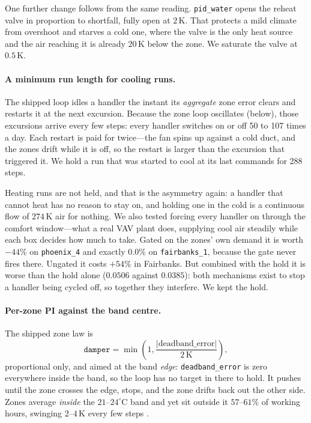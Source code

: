 \documentclass[10pt]{article}
\begin{document}
One further change follows from the same reading. \texttt{pid\_water} opens the
reheat valve in proportion to shortfall, fully open at $2$\,K. That protects a
mild climate from overshoot and starves a cold one, where the valve is the only
heat source and the air reaching it is already $20$\,K below the zone. We
saturate the valve at $0.5$\,K.

\paragraph{A minimum run length for cooling runs.} The shipped loop idles a
handler the instant its \emph{aggregate} zone error clears and restarts it at
the next excursion. Because the zone loop oscillates (below), those excursions
arrive every few steps: every handler switches on or off 50 to 107 times a
day. Each restart is paid for twice---the fan spins up against a cold duct, and
the zones drift while it is off, so the restart is larger than the excursion
that triggered it. We hold a run that was started to cool at its last commands
for 288 steps.

Heating runs are not held, and that is the asymmetry again: a handler that
cannot heat has no reason to stay on, and holding one in the cold is a
continuous flow of $274$\,K air for nothing. We also tested forcing every
handler on through the comfort window---what a real VAV plant does, supplying
cool air steadily while each box decides how much to take. Gated on the zones'
own demand it is worth $-44\%$ on \texttt{phoenix\_4} and exactly $0.0\%$ on
\texttt{fairbanks\_1}, because the gate never fires there. Ungated it costs
$+54\%$ in Fairbanks. But combined with the hold it is worse than the hold
alone ($0.0506$ against $0.0385$): both mechanisms exist to stop a handler
being cycled off, so together they interfere. We kept the hold.

\paragraph{Per-zone PI against the band centre.} The shipped zone law is
\begin{equation}
\texttt{damper} = \min\!\left(1, \frac{|\mathrm{deadband\_error}|}{2\,\mathrm{K}}\right),
\end{equation}
proportional only, and aimed at the band \emph{edge}: \texttt{deadband\_error}
is zero everywhere inside the band, so the loop has no target in there to
hold. It pushes until the zone crosses the edge, stops, and the zone drifts
back out the other side. Zones average \emph{inside} the $21$--$24^{\circ}$C
band and yet sit outside it $57$--$61\%$ of working hours, swinging $2$--$4$\,K
every few steps \cite{probezt}.
\end{document}

